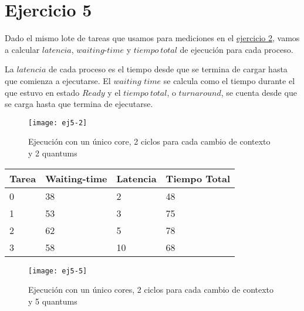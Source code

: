\section{Ejercicio 5}

Dado el mismo lote de tareas que usamos para mediciones en el \hyperref[sec:ej2]{ejercicio 2}, vamos a calcular $latencia$, $waiting$-$time$ y $tiempo\ total$ de ejecución para cada proceso.

La $latencia$ de cada proceso es el tiempo desde que se termina de cargar hasta que comienza a ejecutarse.
El $waiting$ $time$ se calcula como el tiempo durante el que estuvo en estado $Ready$
y el $tiempo\ total$, o $turnaround$, se cuenta desde que se carga hasta que termina de ejecutarse.
\\

\begin{center}
\end{center}

\begin{figure}[H]
		\centering
		\texttt{[image: ej5-2]}
		\caption{Ejecución con un único core, 2 ciclos para cada cambio de contexto y 2 quantums}
		\label{fig:ej5.2}
\end{figure}

\begin{center}
		\begin{tabular}{| l | l | l | l |}
				\hline
				Tarea & Waiting-time & Latencia & Tiempo Total	\\ \hline
				0 &	38	 &	2	 &	48	\\
				1 &	53	 &	3	 &	75	\\
				2 &	62	 &	5	 &	78	\\
				3 &	58	 &	10 &	68	\\
				\hline
		\end{tabular}
\end{center}

\begin{figure}[H]
		\centering
		\texttt{[image: ej5-5]}
		\caption{Ejecución con un único cores, 2 ciclos para cada cambio de contexto y 5 quantums}
		\label{fig:ej5-5}
\end{figure}

